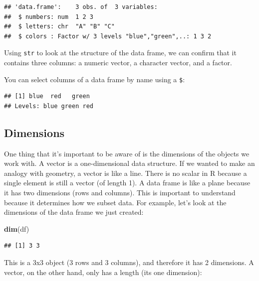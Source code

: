 \documentclass[
]{book}
\newenvironment{Shaded}{\begin{snugshade}}{\end{snugshade}}
\newcommand{\FunctionTok}[1]{\textcolor[rgb]{0.13,0.29,0.53}{\textbf{#1}}}
\newcommand{\NormalTok}[1]{#1}
\newcommand{\SpecialCharTok}[1]{\textcolor[rgb]{0.81,0.36,0.00}{\textbf{#1}}}
\begin{document}
\begin{verbatim}
## 'data.frame':    3 obs. of  3 variables:
##  $ numbers: num  1 2 3
##  $ letters: chr  "A" "B" "C"
##  $ colors : Factor w/ 3 levels "blue","green",..: 1 3 2
\end{verbatim}

Using \texttt{str} to look at the structure of the data frame, we can confirm that it
contains three columns: a numeric vector, a character vector, and a factor.

You can select columns of a data frame by name using a \texttt{\$}:

\begin{Shaded}
\end{Shaded}

\begin{verbatim}
## [1] blue  red   green
## Levels: blue green red
\end{verbatim}

\hypertarget{dimensions}{%
\subsection{Dimensions}\label{dimensions}}

One thing that it's important to be aware of is the dimensions of the objects we
work with. A vector is a one-dimensional data structure. If we wanted to make
an analogy with geometry, a vector is like a line. There is no scalar in R
because a single element is still a vector (of length 1). A data frame is like a
plane because it has two dimensions (rows and columns). This is important to understand because it determines how we subset data. For example, let's look at the dimensions of the data frame we just created:

\begin{Shaded}
\begin{Highlighting}[]
\FunctionTok{dim}\NormalTok{(df)}
\end{Highlighting}
\end{Shaded}

\begin{verbatim}
## [1] 3 3
\end{verbatim}

This is a 3x3 object (3 rows and 3 columns), and therefore it has 2 dimensions.
A vector, on the other hand, only has a length (its one dimension):
\end{document}
